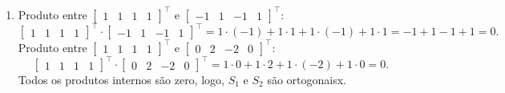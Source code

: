 \begin{resolution}
\begin{enumerate}[label=\alph*)]
    \item Produto entre \(\begin{bmatrix} 1 & 1 & 1 & 1 \end{bmatrix}^{\top}\) e \(\begin{bmatrix} -1 & 1 & -1 & 1 \end{bmatrix}^{\top}\):
          \[
            \begin{bmatrix} 1 & 1 & 1 & 1 \end{bmatrix}^{\top} \cdot \begin{bmatrix} -1 & 1 & -1 & 1 \end{bmatrix}^{\top} = 1 \cdot (-1) + 1 \cdot 1 + 1 \cdot (-1) + 1 \cdot 1 = -1 + 1 - 1 + 1 = 0.
          \]
          Produto entre \(\begin{bmatrix} 1 & 1 & 1 & 1 \end{bmatrix}^{\top}\) e \(\begin{bmatrix} 0 & 2 & -2 & 0 \end{bmatrix}^{\top}\):
          \[
            \begin{bmatrix} 1 & 1 & 1 & 1 \end{bmatrix}^{\top} \cdot \begin{bmatrix} 0 & 2 & -2 & 0 \end{bmatrix}^{\top} = 1 \cdot 0 + 1 \cdot 2 + 1 \cdot (-2) + 1 \cdot 0 = 0.
          \]
          Todos os produtos internos são zero, logo, \( S_1 \) e \( S_2 \) são ortogonaisx.
  \end{enumerate}
\end{resolution}


